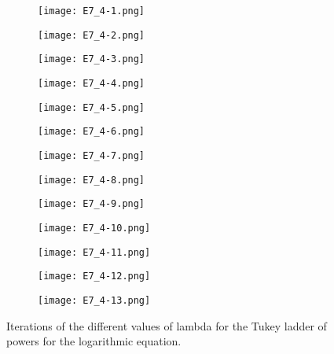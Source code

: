 \documentclass{article}
\begin{document}
\begin{figure}[]
\begin{subfigure}{.23\textwidth}
  \centering
  \texttt{[image: E7\_4-1.png]}  
  \caption{ }
  \label{sb9-1}
\end{subfigure}
\begin{subfigure}{.23\textwidth}
  \centering
  \texttt{[image: E7\_4-2.png]}  
  \caption{ }
  \label{sb9-2}
\end{subfigure}
\begin{subfigure}{.23\textwidth}
  \centering
  \texttt{[image: E7\_4-3.png]}  
  \caption{ }
  \label{sb9-3}
\end{subfigure}
\begin{subfigure}{.23\textwidth}
  \centering
  \texttt{[image: E7\_4-4.png]}  
  \caption{ }
  \label{sb9-4}
\end{subfigure}
\newline
\begin{subfigure}{.23\textwidth}
  \centering
  \texttt{[image: E7\_4-5.png]}  
  \caption{ }
  \label{sb9-5}
\end{subfigure}
\begin{subfigure}{.23\textwidth}
  \centering
  \texttt{[image: E7\_4-6.png]}  
  \caption{ }
  \label{sb9-6}
\end{subfigure}
\begin{subfigure}{.23\textwidth}
  \centering
  \texttt{[image: E7\_4-7.png]}  
  \caption{ }
  \label{sb9-7}
\end{subfigure}
\begin{subfigure}{.23\textwidth}
  \centering
  \texttt{[image: E7\_4-8.png]}  
  \caption{ }
  \label{sb9-8}
\end{subfigure}
\newline
\begin{subfigure}{.23\textwidth}
  \centering
  \texttt{[image: E7\_4-9.png]}  
  \caption{ }
  \label{sb9-9}
\end{subfigure}
\begin{subfigure}{.23\textwidth}
  \centering
  \texttt{[image: E7\_4-10.png]}  
  \caption{ }
  \label{sb9-10}
\end{subfigure}
\begin{subfigure}{.23\textwidth}
  \centering
  \texttt{[image: E7\_4-11.png]}  
  \caption{ }
  \label{sb9-11}
\end{subfigure}
\begin{subfigure}{.23\textwidth}
  \centering
  \texttt{[image: E7\_4-12.png]}  
  \caption{ }
  \label{sb9-12}
\end{subfigure}
\newline
\begin{subfigure}{1\textwidth}
  \centering
  \texttt{[image: E7\_4-13.png]}  
  \caption{ }
  \label{sb9-13}
\end{subfigure}
\caption{Iterations of the different values of lambda for the Tukey ladder of powers for the logarithmic equation.}
\label{fig9}
\end{figure}
\end{document}
